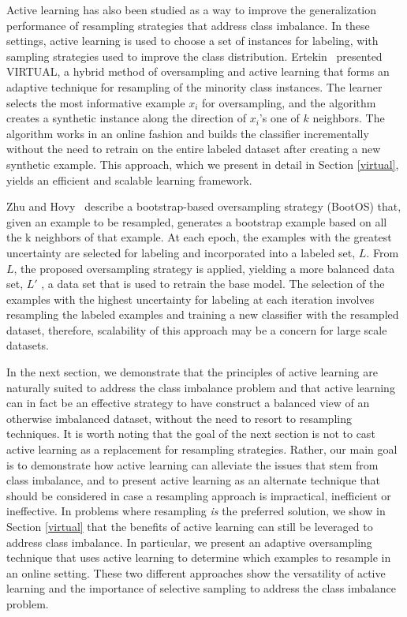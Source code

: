 Active learning has also been studied as a way to improve the generalization performance of resampling strategies that address class imbalance. In these settings, active learning is used to choose a set of instances for labeling, with sampling strategies used to improve the class distribution. Ertekin~\cite{Ertekin_dissertation} presented \textsc{VIRTUAL}, a hybrid method of oversampling and active learning that forms an adaptive technique for resampling of the minority class instances. The learner selects the most informative example $x_i$ for oversampling, and the algorithm creates a synthetic instance along the direction of $x_i$'s one of $k$ neighbors. The algorithm works in an online fashion and builds the classifier incrementally without the need to retrain on the entire labeled dataset after creating a new synthetic example. This approach, which we present in detail in Section \ref{virtual}, yields an efficient and scalable learning framework. 

Zhu and Hovy~\cite{zhu2007imbalance} describe a bootstrap-based oversampling strategy (BootOS) that, given an example to be resampled, generates  a bootstrap example based on all the k neighbors of that example. At each epoch, the examples with the greatest uncertainty are selected for labeling and incorporated into a labeled set, $L$. From $L$, the proposed oversampling strategy is applied, yielding a more balanced data set, $L'$ , a data set that is used to retrain the base model. The selection of the examples with the highest uncertainty for labeling at each iteration involves  resampling the labeled examples and training a new classifier with the resampled dataset, therefore, scalability of this approach may be a concern for large scale datasets.


In the next section, we demonstrate that the principles of active learning are naturally suited to address the class imbalance problem and that active learning can in fact be an effective strategy to have construct a balanced view of an otherwise imbalanced dataset, without the need to resort to resampling techniques. It is worth noting that the goal of the next section is not to cast active learning as a replacement for resampling strategies. Rather, our main goal is to demonstrate how active learning can alleviate the issues that stem from class imbalance, and to present active learning as an alternate technique that should be considered in case a resampling approach is impractical, inefficient or ineffective. In problems where resampling \textit{is} the preferred solution, we show in Section \ref{virtual} that the benefits of active learning can still be leveraged to address class imbalance. In particular, we present an adaptive oversampling technique that uses active learning to determine which examples to resample in an online setting. These two different approaches show the versatility of active learning and the importance of selective sampling to address the class imbalance problem.

